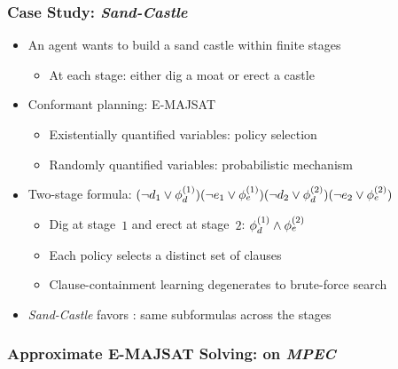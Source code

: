 \begin{frame}
    \frametitle{Case Study: \textit{Sand-Castle}}
    \begin{itemize}
        \item An agent wants to build a sand castle within finite stages
              \begin{itemize}
                  \item At each stage: either dig a moat or erect a castle
              \end{itemize}
              \pause
        \item Conformant planning: E-MAJSAT
              \begin{itemize}
                  \item Existentially quantified variables: policy selection
                  \item Randomly quantified variables: probabilistic mechanism
              \end{itemize}
              \pause
        \item Two-stage formula: $(\lnot d_1\lor \phi_d^{(1)})(\lnot e_1\lor \phi_e^{(1)})(\lnot d_2\lor \phi_d^{(2)})(\lnot e_2\lor \phi_e^{(2)})$
              \begin{itemize}
                  \item Dig at stage~$1$ and erect at stage~$2$: $\phi_d^{(1)}\land\phi_e^{(2)}$
                  \item Each policy selects a distinct set of clauses
                  \item Clause-containment learning degenerates to brute-force search
              \end{itemize}
              \pause
        \item \textit{Sand-Castle} favors \dcssat: same subformulas  across the stages
    \end{itemize}
\end{frame}

\begin{frame}
    \frametitle{Approximate E-MAJSAT Solving: \erssat on \textit{MPEC}}
    \begin{table}[ht]
        \centering
        \scriptsize
    \end{table}
\end{frame}